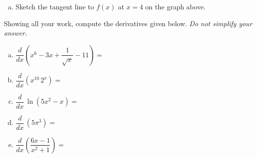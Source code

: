 \documentclass[12pt,letterpaper]{exam}
\begin{document}
\begin{questions}
\begin{enumerate}[(a)]
	\item Sketch the tangent line to $f(x)$ at $x= 4$ on the graph above. 
	\end{enumerate}



\newpage
\question[15] Showing all your work, compute the derivatives given below. {\itshape Do not simplify your answer.} \pvspace{0.3cm}
	\begin{enumerate}[(a)]
	\item $\dfrac{d}{dx} \left( x^6 - 3x + \dfrac{1}{\sqrt{x}} - 11 \right)=$ \vfill
	\item $\dfrac{d}{dx} (x^{10}\, 2^x)=$ \vfill
	\item $\dfrac{d}{dx}\, \ln(5x^2 - x)=$ \vfill
	\item $\dfrac{d}{dx} \, (5\pi^3)=$ \vfill
	\item $\dfrac{d}{dx} \left(\dfrac{6x - 1}{x^2 + 1} \right)=$ \vfill
	\end{enumerate}




\end{questions}
\end{document}
